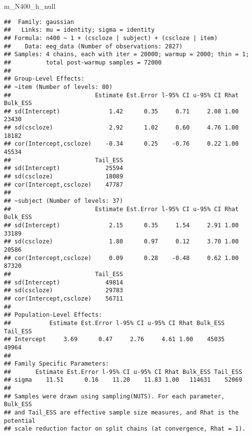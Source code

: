 \documentclass[12pt,ignorenonframetext,aspectratio=169]{beamer}
\newenvironment{Shaded}{\begin{snugshade}}{\end{snugshade}}
\newcommand{\NormalTok}[1]{#1}
\begin{document}
\begin{frame}[fragile]

\tiny

\begin{Shaded}
\begin{Highlighting}[]
\NormalTok{m_N400_h_null}
\end{Highlighting}
\end{Shaded}

\begin{verbatim}
##  Family: gaussian 
##   Links: mu = identity; sigma = identity 
## Formula: n400 ~ 1 + (cscloze | subject) + (cscloze | item) 
##    Data: eeg_data (Number of observations: 2827) 
## Samples: 4 chains, each with iter = 20000; warmup = 2000; thin = 1;
##          total post-warmup samples = 72000
## 
## Group-Level Effects: 
## ~item (Number of levels: 80) 
##                        Estimate Est.Error l-95% CI u-95% CI Rhat Bulk_ESS
## sd(Intercept)              1.42      0.35     0.71     2.08 1.00    23430
## sd(cscloze)                2.92      1.02     0.60     4.76 1.00    18182
## cor(Intercept,cscloze)    -0.34      0.25    -0.76     0.22 1.00    45534
##                        Tail_ESS
## sd(Intercept)             25594
## sd(cscloze)               18089
## cor(Intercept,cscloze)    47787
## 
## ~subject (Number of levels: 37) 
##                        Estimate Est.Error l-95% CI u-95% CI Rhat Bulk_ESS
## sd(Intercept)              2.15      0.35     1.54     2.91 1.00    33189
## sd(cscloze)                1.80      0.97     0.12     3.70 1.00    20586
## cor(Intercept,cscloze)     0.09      0.28    -0.48     0.62 1.00    87320
##                        Tail_ESS
## sd(Intercept)             49814
## sd(cscloze)               29783
## cor(Intercept,cscloze)    56711
## 
## Population-Level Effects: 
##           Estimate Est.Error l-95% CI u-95% CI Rhat Bulk_ESS Tail_ESS
## Intercept     3.69      0.47     2.76     4.61 1.00    45035    49964
## 
## Family Specific Parameters: 
##       Estimate Est.Error l-95% CI u-95% CI Rhat Bulk_ESS Tail_ESS
## sigma    11.51      0.16    11.20    11.83 1.00   114631    52069
## 
## Samples were drawn using sampling(NUTS). For each parameter, Bulk_ESS
## and Tail_ESS are effective sample size measures, and Rhat is the potential
## scale reduction factor on split chains (at convergence, Rhat = 1).
\end{verbatim}

\end{frame}
\end{document}
